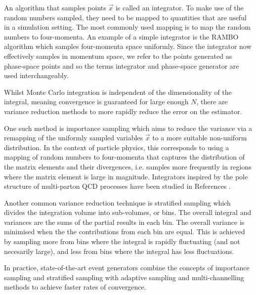 \documentclass[main.tex]{subfiles}
\begin{document}
    An algorithm that samples points $\vec{x}$ is called
    an integrator. To make use of the random numbers sampled,
    they need to be mapped to quantities that are useful in a simulation
    setting. The most commonly used mapping is to map
    the random numbers to four-momenta. An example of a
    simple integrator is the RAMBO algorithm \cite{Kleiss:1985gy,Platzer:2013esa}
    which samples four-momenta space uniformly. Since the integrator
    now effectively samples in momentum space, we refer to the points
    generated as phase-space points and so the terms integrator
    and phase-space generator are used interchangeably.

    Whilst Monte Carlo integration is independent of the
    dimensionality of the integral, meaning convergence is
    guaranteed for large enough $N$, there are variance
    reduction methods to more rapidly reduce the error
    on the estimator.

    One such method is importance sampling which
    aims to reduce the variance via a remapping of the
    uniformly sampled variables $\vec{x}$
    to a more suitable non-uniform distribution.
    In the context of particle physics,
    this corresponds to using a mapping of random numbers
    to four-momenta that captures the distribution of the
    matrix elements and their divergences, i.e. samples
    more frequently in regions where the matrix element
    is large in magnitude. Integrators inspired by the pole
    structure of multi-parton QCD processes have been
    studied in References \cite{Draggiotis:2000gm,vanHameren:2002tc}.
    
    Another common variance reduction technique is
    stratified sampling which divides the integration
    volume into sub-volumes, or bins. The overall integral
    and variances are the sums of the partial results
    in each bin. The overall variance is minimised when
    the the contributions from each bin are equal. This
    is achieved by sampling more from bins where the integral
    is rapidly fluctuating (and not necesarily large),
    and less from bins where the integral has less fluctuations.
    
    In practice, state-of-the-art event generators
    combine the concepts of importance sampling and stratified
    sampling with adaptive sampling \cite{Lepage:1977sw,Lepage:2020tgj}
    and multi-channelling methods \cite{Kleiss:1994qy,Ohl:1998jn}
    to achieve faster rates of convergence.
\end{document}

